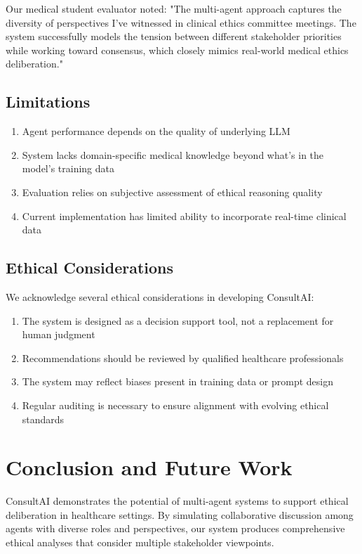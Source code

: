 \documentclass[11pt]{article}
\begin{document}
Our medical student evaluator noted: "The multi-agent approach captures the diversity of perspectives I've witnessed in clinical ethics committee meetings. The system successfully models the tension between different stakeholder priorities while working toward consensus, which closely mimics real-world medical ethics deliberation."

\subsection{Limitations}

\begin{enumerate}
    \item Agent performance depends on the quality of underlying LLM
    \item System lacks domain-specific medical knowledge beyond what's in the model's training data
    \item Evaluation relies on subjective assessment of ethical reasoning quality
    \item Current implementation has limited ability to incorporate real-time clinical data
\end{enumerate}

\subsection{Ethical Considerations}

We acknowledge several ethical considerations in developing ConsultAI:
\begin{enumerate}
    \item The system is designed as a decision support tool, not a replacement for human judgment
    \item Recommendations should be reviewed by qualified healthcare professionals
    \item The system may reflect biases present in training data or prompt design
    \item Regular auditing is necessary to ensure alignment with evolving ethical standards
\end{enumerate}

\section{Conclusion and Future Work}

ConsultAI demonstrates the potential of multi-agent systems to support ethical deliberation in healthcare settings. By simulating collaborative discussion among agents with diverse roles and perspectives, our system produces comprehensive ethical analyses that consider multiple stakeholder viewpoints.
\end{document}
